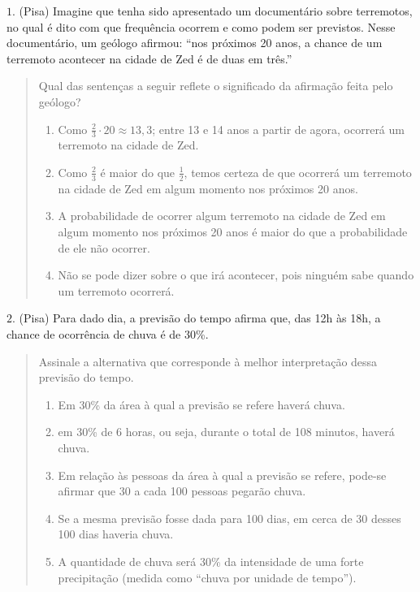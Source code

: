 \exercise
\label{\detokenize{PE511-E:exercicios}}\label{\detokenize{PE511-E::doc}}
\(1.\) (Pisa) Imagine que tenha sido apresentado um documentário sobre terremotos, no qual é dito com que frequência ocorrem  e como podem ser previstos. Nesse documentário, um geólogo afirmou: “nos próximos  20 anos, a chance de um terremoto acontecer na cidade de Zed é de duas em três.”
\begin{quote}

Qual das sentenças a seguir reflete o significado da afirmação feita pelo geólogo?
\begin{enumerate}
\item {} 
Como \(\frac{2}{3}\cdot 20\approx 13,3\); entre 13 e 14 anos a partir de agora, ocorrerá um terremoto na cidade de Zed.

\item {} 
Como \(\frac{2}{3}\) é maior do que \(\frac{1}{2}\), temos certeza de que ocorrerá um terremoto na cidade de Zed em algum momento nos próximos 20 anos.

\item {} 
A probabilidade de ocorrer algum terremoto na cidade de Zed em algum momento nos próximos 20 anos é maior do que a probabilidade de ele não ocorrer.

\item {} 
Não se pode dizer sobre o que irá acontecer, pois ninguém sabe quando um terremoto ocorrerá.

\end{enumerate}
\end{quote}

\(2.\) (Pisa) Para dado dia, a previsão do tempo afirma que, das 12h às 18h, a chance de ocorrência de chuva é de 30\%.
\begin{quote}

Assinale a alternativa que corresponde à melhor interpretação dessa previsão do tempo.
\begin{enumerate}
\item {} 
Em 30\% da área à qual a previsão se refere haverá chuva.

\item {} 
em 30\% de 6 horas, ou seja, durante o total de 108 minutos, haverá chuva.

\item {} 
Em relação às pessoas da área à qual a previsão se refere, pode-se afirmar que 30 a cada 100 pessoas pegarão chuva.

\item {} 
Se a mesma previsão fosse dada para 100 dias, em cerca de 30 desses 100 dias haveria chuva.

\item {} 
A quantidade de chuva será 30\% da intensidade de uma forte precipitação (medida como “chuva por unidade de tempo”).

\end{enumerate}
\end{quote}

